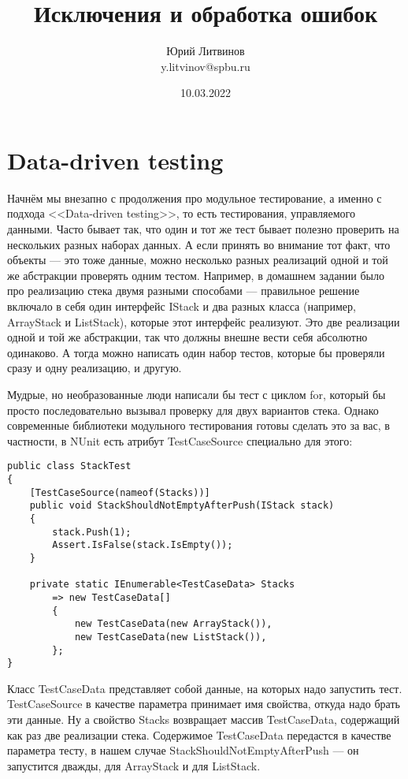 \documentclass[a5paper]{article}
\title{Исключения и обработка ошибок}
\author{Юрий Литвинов\\\small{y.litvinov@spbu.ru}}
\date{10.03.2022}
\begin{document}
\maketitle
\thispagestyle{empty}

\section{Data-driven testing}

Начнём мы внезапно с продолжения про модульное тестирование, а именно с подхода <<Data-driven testing>>, то есть тестирования, управляемого данными. Часто бывает так, что один и тот же тест бывает полезно проверить на нескольких разных наборах данных. А если принять во внимание тот факт, что объекты --- это тоже данные, можно несколько разных реализаций одной и той же абстракции проверять одним тестом. Например, в домашнем задании было про реализацию стека двумя разными способами --- правильное решение включало в себя один интерфейс IStack и два разных класса (например, ArrayStack и ListStack), которые этот интерфейс реализуют. Это две реализации одной и той же абстракции, так что должны внешне вести себя абсолютно одинаково. А тогда можно написать один набор тестов, которые бы проверяли сразу и одну реализацию, и другую.

Мудрые, но необразованные люди написали бы тест с циклом for, который бы просто последовательно вызывал проверку для двух вариантов стека. Однако современные библиотеки модульного тестирования готовы сделать это за вас, в частности, в NUnit есть атрибут TestCaseSource специально для этого:

\begin{verbatim}
public class StackTest
{
    [TestCaseSource(nameof(Stacks))]
    public void StackShouldNotEmptyAfterPush(IStack stack)
    {
        stack.Push(1);
        Assert.IsFalse(stack.IsEmpty());
    }

    private static IEnumerable<TestCaseData> Stacks
        => new TestCaseData[]
        {
            new TestCaseData(new ArrayStack()),
            new TestCaseData(new ListStack()),
        };
}
\end{verbatim}

Класс TestCaseData представляет собой данные, на которых надо запустить тест. TestCaseSource в качестве параметра принимает имя свойства, откуда надо брать эти данные. Ну а свойство Stacks возвращает массив TestCaseData, содержащий как раз две реализации стека. Содержимое TestCaseData передастся в качестве параметра тесту, в нашем случае StackShouldNotEmptyAfterPush --- он запустится дважды, для ArrayStack и для ListStack.
\end{document}
